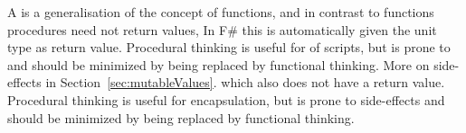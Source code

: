 A  is a generalisation of the concept of functions, and in contrast to functions procedures need not return values,
%
In F\# this is automatically given the unit type as return value. Procedural thinking is useful for  of scripts, but is prone to  and should be minimized by being replaced by functional thinking. More on side-effects in Section~\ref{sec:mutableValues}.
which also does not have a return value. Procedural thinking is useful for encapsulation, but is prone to side-effects and should be minimized by being replaced by functional thinking.

